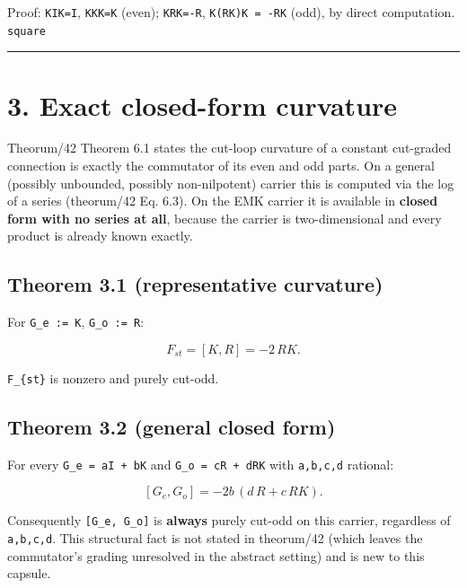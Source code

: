 Proof: \texttt{KIK=I}, \texttt{KKK=K} (even); \texttt{KRK=-R}, \texttt{K(RK)K\ =\ -RK} (odd), by direct
computation. \texttt{square}

\begin{center}\rule{0.5\linewidth}{0.5pt}\end{center}

\hypertarget{exact-closed-form-curvature}{%
\section{3. Exact closed-form curvature}\label{exact-closed-form-curvature}}

Theorum/42 Theorem 6.1 states the cut-loop curvature of a constant
cut-graded connection is exactly the commutator of its even and odd parts.
On a general (possibly unbounded, possibly non-nilpotent) carrier this is
computed via the log of a series (theorum/42 Eq. 6.3). On the EMK carrier
it is available in \textbf{closed form with no series at all}, because the
carrier is two-dimensional and every product is already known exactly.

\hypertarget{theorem-3.1-representative-curvature}{%
\subsection{Theorem 3.1 (representative curvature)}\label{theorem-3.1-representative-curvature}}

For \texttt{G\_e\ :=\ K}, \texttt{G\_o\ :=\ R}:

\[
\boxed{
F_{st} = [K, R] = -2\,RK.
}
\]

\texttt{F\_\{st\}} is nonzero and purely cut-odd.

\hypertarget{theorem-3.2-general-closed-form}{%
\subsection{Theorem 3.2 (general closed form)}\label{theorem-3.2-general-closed-form}}

For every \texttt{G\_e\ =\ aI\ +\ bK} and \texttt{G\_o\ =\ cR\ +\ dRK} with \texttt{a,b,c,d} rational:

\[
\boxed{
[G_e, G_o] = -2b\,(d\,R + c\,RK).
}
\]

Consequently \texttt{{[}G\_e,\ G\_o{]}} is \textbf{always} purely cut-odd on this carrier,
regardless of \texttt{a,b,c,d}. This structural fact is not stated in theorum/42
(which leaves the commutator's grading unresolved in the abstract setting)
and is new to this capsule.

